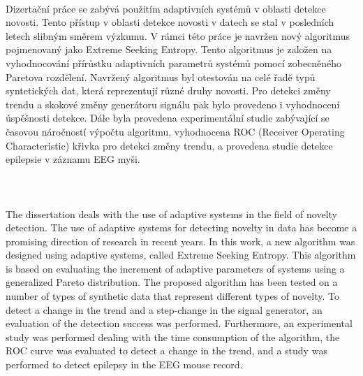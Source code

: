 



\clearpage
\thispagestyle{empty}

 \\ [5mm]
Dizertační práce se zabývá použitím adaptivních systémů v oblasti detekce novosti. Tento přístup v oblasti detekce novosti v datech se stal v posledních letech slibným směrem výzkumu. V rámci této práce je navržen nový algoritmus pojmenovaný jako Extreme Seeking Entropy. Tento algoritmus je založen na vyhodnocování přírůstku adaptivních parametrů systémů pomocí zobecněného Paretova rozdělení. Navržený algoritmus byl otestován na celé řadě typů syntetických dat, která reprezentují různé druhy novosti. Pro detekci změny trendu a skokové změny generátoru signálu pak bylo provedeno i vyhodnocení úspěšnosti detekce. Dále byla provedena experimentální studie zabývající se časovou náročností výpočtu algoritmu, vyhodnocena ROC (Receiver Operating Characteristic) křivka pro detekci změny trendu, a provedena studie detekce epilepsie v záznamu EEG myši.\\ [5mm]
  \\ [5mm]  \\ [5mm]

 \\ [5mm] 
The dissertation deals with the use of adaptive systems in the field of novelty detection. The use of adaptive systems for detecting novelty in data has become a promising direction of research in recent years. In this work, a new algorithm was designed using adaptive systems, called Extreme Seeking Entropy. This algorithm is based on evaluating the increment of adaptive parameters of systems using a generalized Pareto distribution. The proposed algorithm has been tested on a number of types of synthetic data that represent different types of novelty. To detect a change in the trend and a step-change in the signal generator, an evaluation of the detection success was performed. Furthermore, an experimental study was performed dealing with the time consumption of the algorithm, the ROC curve was evaluated to detect a change in the trend, and a study was performed to detect epilepsy in the EEG mouse record.
\\ [5mm]



